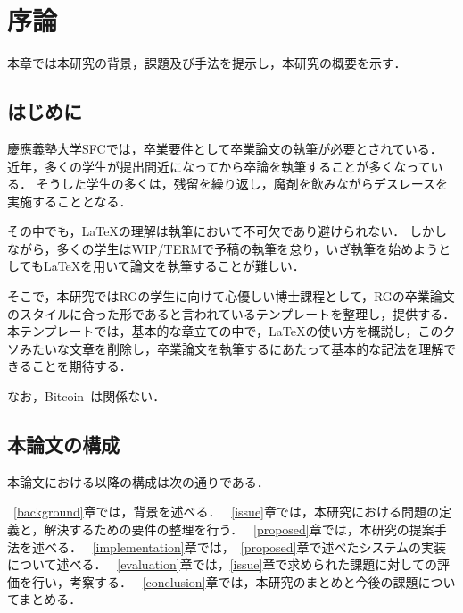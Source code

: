 \chapter{序論}
\label{introduction}

本章では本研究の背景，課題及び手法を提示し，本研究の概要を示す．

\section{はじめに}
\label{introduction:background}
慶應義塾大学SFCでは，卒業要件として卒業論文の執筆が必要とされている．
近年，多くの学生が提出間近になってから卒論を執筆することが多くなっている．
そうした学生の多くは，残留を繰り返し，魔剤を飲みながらデスレースを実施することとなる．

その中でも，\LaTeX の理解は執筆において不可欠であり避けられない．
しかしながら，多くの学生はWIP/TERMで予稿の執筆を怠り，いざ執筆を始めようとしても\LaTeX を用いて論文を執筆することが難しい．

そこで，本研究ではRGの学生に向けて心優しい博士課程として，RGの卒業論文のスタイルに合った形であると言われているテンプレートを整理し，提供する．
本テンプレートでは，基本的な章立ての中で，\LaTeX の使い方を概説し，このクソみたいな文章を削除し，卒業論文を執筆するにあたって基本的な記法を理解できることを期待する．

なお，Bitcoin~\cite{Bitcoin}は関係ない．

\section{本論文の構成}

本論文における以降の構成は次の通りである．

~\ref{background}章では，背景を述べる．
~\ref{issue}章では，本研究における問題の定義と，解決するための要件の整理を行う．
~\ref{proposed}章では，本研究の提案手法を述べる．
~\ref{implementation}章では，~\ref{proposed}章で述べたシステムの実装について述べる．
~\ref{evaluation}章では，\ref{issue}章で求められた課題に対しての評価を行い，考察する．
~\ref{conclusion}章では，本研究のまとめと今後の課題についてまとめる．


